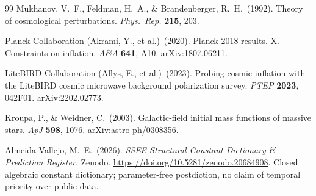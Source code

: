 \documentclass[12pt,a4paper]{article}
\begin{document}
\begin{thebibliography}{99}
Mukhanov, V.~F., Feldman, H.~A., \& Brandenberger, R.~H.\ (1992).
Theory of cosmological perturbations.
\textit{Phys.\ Rep.} \textbf{215}, 203.

Planck Collaboration (Akrami, Y., et al.)\ (2020).
Planck 2018 results. X. Constraints on inflation.
\textit{A\&A} \textbf{641}, A10. arXiv:1807.06211.

LiteBIRD Collaboration (Allys, E., et al.)\ (2023).
Probing cosmic inflation with the LiteBIRD cosmic microwave background polarization survey.
\textit{PTEP} \textbf{2023}, 042F01. arXiv:2202.02773.

Kroupa, P., \& Weidner, C.\ (2003).
Galactic-field initial mass functions of massive stars.
\textit{ApJ} \textbf{598}, 1076. arXiv:astro-ph/0308356.

Almeida Vallejo, M.~E.\ (2026).
\textit{SSEE Structural Constant Dictionary \& Prediction Register}.
Zenodo. \url{https://doi.org/10.5281/zenodo.20684908}.
Closed algebraic constant dictionary; parameter-free postdiction, no claim of
temporal priority over public data.

\end{thebibliography}
\end{document}
